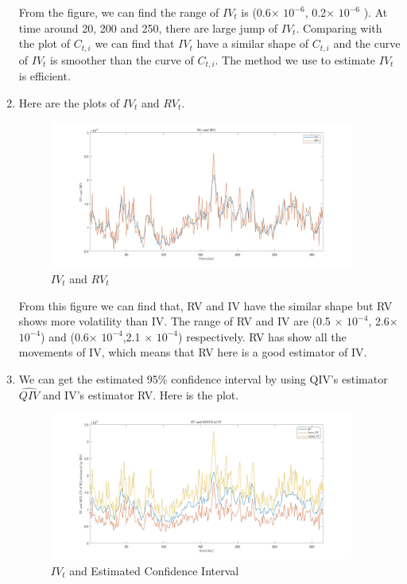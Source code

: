\documentclass[12pt,letterpaper]{article}
\begin{document}
\begin{enumerate}[label=\textbf{(\Alph*)}]
\begin{figure}[H]
        \end{figure}
        
From the figure, we can find the range of $IV_t$ is (0.6$\times$ $10^{-6}$, 0.2$\times$ $10^{-6}$ ). At time around 20, 200 and 250, there are large jump of $IV_t$. Comparing with the plot of $C_{t,i}$ we can find that $IV_t$ have a similar shape of $C_{t,i}$ and the curve of $IV_t$ is smoother than the curve of $C_{t,i}$. The method we use to estimate $IV_t$ is efficient. \\

\item Here are the plots of $IV_t$ and $RV_t$.
      \begin{figure}[H]
            \centering
            \includegraphics[width=10cm]{figures/p3_ex3_d.jpg}
            \caption{$IV_t$ and $RV_t$}
           
        \end{figure}
        
From this figure we can find that, RV and IV have the similar shape but RV shows more volatility than IV. The range of RV and IV are (0.5 $\times$ $10^{-4}$, 2.6$\times$ $10^{-4}$) and (0.6$\times$ $10^{-4}$,2.1 $\times$ $10^{-4}$) respectively. RV has show all the movements of IV, which means that RV here is a good estimator of IV.\\

\item We can get the estimated 95\% confidence interval by using QIV's estimator $\hat{QIV}$ and IV's estimator RV. Here is the plot.
\begin{figure}[H]
            \centering
            \includegraphics[width=10cm]{figures/p3_ex3_e.jpg}
            \caption{$IV_t$ and Estimated Confidence Interval}
           

\end{figure}
\end{enumerate}
\end{document}
